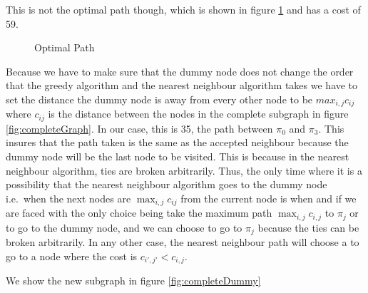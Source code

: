 This is not the optimal path though, which is shown in figure \ref{fig:optcompleteGraph} and has a cost of 59.

\begin{figure}
\centering
{}
\caption{Optimal Path}
\label{fig:optcompleteGraph}
\end{figure}


Because we have to make sure that the dummy node does not change the order that the greedy algorithm and the nearest neighbour algorithm takes we have to set the distance the dummy node is away from every other node to be $max_{i,j} c_{ij} $ where $c_{ij}$ is the distance between the nodes in the complete subgraph in figure \ref{fig:completeGraph}. In our case, this is 35, the path between $\pi_0$ and $\pi_3$. This insures that the path taken is the same as the accepted neighbour because the dummy node will be the last node to be visited. This is because in the nearest neighbour algorithm, ties are broken arbitrarily. Thus, the only time where it is a possibility that the nearest neighbour algorithm goes to the dummy node i.e.\ when the next nodes are $\max_{i,j} c_{ij}$ from the current node is when and if we are faced with the only choice being take the maximum path $\max_{i,j} c_{i,j}$ to $\pi_j$ or to go to the dummy node, and we can choose to go to $\pi_j$ because the ties can be broken arbitrarily. In any other case, the nearest neighbour path will choose a to go to a node where the cost is $c_{i',j'} < c_{i,j}$. 

We show the new subgraph in figure \ref{fig:completeDummy}

